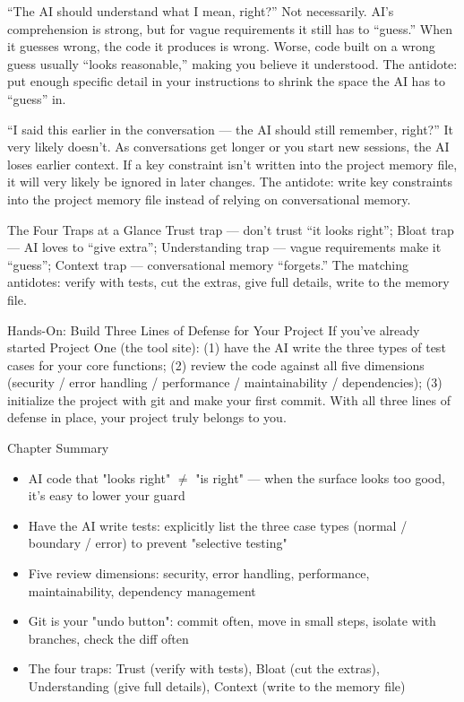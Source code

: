 
“The AI should understand what I mean, right?” Not necessarily. AI's comprehension is strong, but for vague requirements it still has to “guess.” When it guesses wrong, the code it produces is wrong. Worse, code built on a wrong guess usually “looks reasonable,” making you believe it understood. The antidote: put enough specific detail in your instructions to shrink the space the AI has to “guess” in.


“I said this earlier in the conversation — the AI should still remember, right?” It very likely doesn't. As conversations get longer or you start new sessions, the AI loses earlier context. If a key constraint isn't written into the project memory file, it will very likely be ignored in later changes. The antidote: write key constraints into the project memory file instead of relying on conversational memory.

\begin{tcbwarn}{The Four Traps at a Glance}
Trust trap — don't trust “it looks right”; Bloat trap — AI loves to “give extra”; Understanding trap — vague requirements make it “guess”; Context trap — conversational memory “forgets.” The matching antidotes: verify with tests, cut the extras, give full details, write to the memory file.

\end{tcbwarn}

\begin{tcbpractice}{Hands-On: Build Three Lines of Defense for Your Project}
If you've already started Project One (the tool site): (1) have the AI write the three types of test cases for your core functions; (2) review the code against all five dimensions (security / error handling / performance / maintainability / dependencies); (3) initialize the project with git and make your first commit. With all three lines of defense in place, your project truly belongs to you.

\end{tcbpractice}

\begin{tcbsummary}{Chapter Summary}
\begin{itemize}
  \item AI code that "looks right" $\neq$ "is right" — when the surface looks too good, it's easy to lower your guard
  \item Have the AI write tests: explicitly list the three case types (normal / boundary / error) to prevent "selective testing"
  \item Five review dimensions: security, error handling, performance, maintainability, dependency management
  \item Git is your "undo button": commit often, move in small steps, isolate with branches, check the diff often
  \item The four traps: Trust (verify with tests), Bloat (cut the extras), Understanding (give full details), Context (write to the memory file)
\end{itemize}

\end{tcbsummary}
